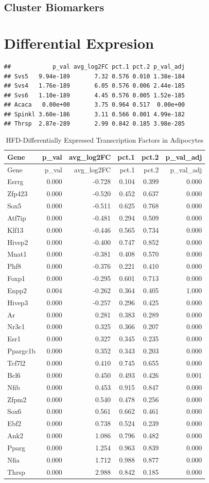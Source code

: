 \documentclass[]{article}
\begin{document}
\hypertarget{cluster-biomarkers}{%
\subsection{Cluster Biomarkers}\label{cluster-biomarkers}}

\hypertarget{differential-expresion}{%
\section{Differential Expresion}\label{differential-expresion}}

\begin{verbatim}
##            p_val avg_log2FC pct.1 pct.2 p_val_adj
## Svs5   9.94e-189       7.32 0.576 0.010 1.38e-184
## Svs4   1.76e-189       6.05 0.576 0.006 2.44e-185
## Svs6   1.10e-189       4.45 0.576 0.005 1.52e-185
## Acaca   0.00e+00       3.75 0.964 0.517  0.00e+00
## Spinkl 3.60e-186       3.11 0.566 0.001 4.99e-182
## Thrsp  2.87e-289       2.99 0.842 0.185 3.98e-285
\end{verbatim}

\begin{longtable}[]{@{}lrrrrr@{}}
\caption{HFD-Differentially Expressed Transcription Factors in
Adipocytes}\tabularnewline
\toprule
Gene & p\_val & avg\_log2FC & pct.1 & pct.2 & p\_val\_adj\tabularnewline
\midrule
\endfirsthead
\toprule
Gene & p\_val & avg\_log2FC & pct.1 & pct.2 & p\_val\_adj\tabularnewline
\midrule
\endhead
Esrrg & 0.000 & -0.728 & 0.104 & 0.399 & 0.000\tabularnewline
Zfp423 & 0.000 & -0.520 & 0.452 & 0.637 & 0.000\tabularnewline
Sox5 & 0.000 & -0.511 & 0.625 & 0.768 & 0.000\tabularnewline
Atf7ip & 0.000 & -0.481 & 0.294 & 0.509 & 0.000\tabularnewline
Klf13 & 0.000 & -0.446 & 0.565 & 0.734 & 0.000\tabularnewline
Hivep2 & 0.000 & -0.400 & 0.747 & 0.852 & 0.000\tabularnewline
Mnat1 & 0.000 & -0.381 & 0.408 & 0.570 & 0.000\tabularnewline
Phf8 & 0.000 & -0.376 & 0.221 & 0.410 & 0.000\tabularnewline
Foxp1 & 0.000 & -0.295 & 0.601 & 0.713 & 0.000\tabularnewline
Enpp2 & 0.004 & -0.262 & 0.364 & 0.405 & 1.000\tabularnewline
Hivep3 & 0.000 & -0.257 & 0.296 & 0.425 & 0.000\tabularnewline
Ar & 0.000 & 0.281 & 0.383 & 0.289 & 0.000\tabularnewline
Nr3c1 & 0.000 & 0.325 & 0.366 & 0.207 & 0.000\tabularnewline
Esr1 & 0.000 & 0.327 & 0.345 & 0.235 & 0.000\tabularnewline
Ppargc1b & 0.000 & 0.352 & 0.343 & 0.203 & 0.000\tabularnewline
Tcf7l2 & 0.000 & 0.410 & 0.745 & 0.655 & 0.000\tabularnewline
Bcl6 & 0.000 & 0.450 & 0.493 & 0.426 & 0.001\tabularnewline
Nfib & 0.000 & 0.453 & 0.915 & 0.847 & 0.000\tabularnewline
Zfpm2 & 0.000 & 0.540 & 0.478 & 0.256 & 0.000\tabularnewline
Sox6 & 0.000 & 0.561 & 0.662 & 0.461 & 0.000\tabularnewline
Ebf2 & 0.000 & 0.738 & 0.524 & 0.239 & 0.000\tabularnewline
Ank2 & 0.000 & 1.086 & 0.796 & 0.482 & 0.000\tabularnewline
Pparg & 0.000 & 1.254 & 0.963 & 0.839 & 0.000\tabularnewline
Nfia & 0.000 & 1.712 & 0.988 & 0.877 & 0.000\tabularnewline
Thrsp & 0.000 & 2.988 & 0.842 & 0.185 & 0.000\tabularnewline
\bottomrule
\end{longtable}
\end{document}
